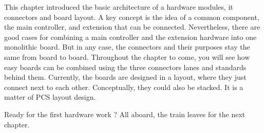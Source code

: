 This chapter introduced the basic architecture of a hardware modules, it connectors and board layout. A key concept is the idea of a common component, the main controller, and extension that can be connected. Nevertheless, there are good cases for combining a main controller and the extension hardware into one monolithic board. But in any case, the connectors and their purposes stay the same from board to board. Throughout the chapter to come, you will see how easy boards can be combined using the three connectors lanes and standards behind them. Currently, the boards are designed in a layout, where they just connect next to each other. Conceptually, they could also be stacked. It is a matter of PCS layout design.

Ready for the first hardware work ? All aboard, the train leaves for the next chapter.

